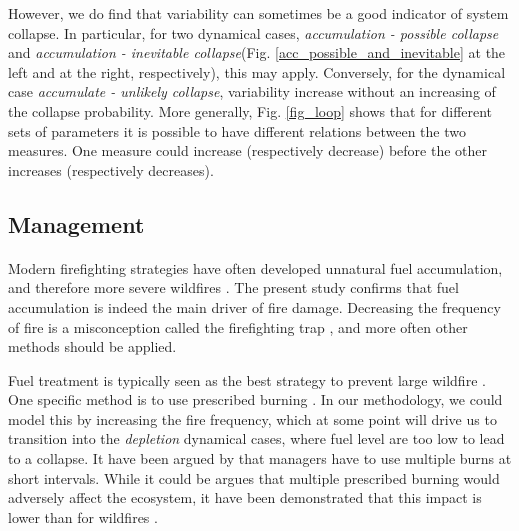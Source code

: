 \documentclass{article}
\begin{document}
However, we do find that variability can sometimes be a good indicator of system collapse. In particular, for two dynamical cases, \textit{accumulation - possible collapse} and \textit{accumulation - inevitable collapse}(Fig. \ref{acc_possible_and_inevitable} at the left and at the right, respectively), this may apply. Conversely, for the dynamical case \textit{accumulate - unlikely collapse}, variability increase without an increasing of the collapse probability. More generally, Fig. \ref{fig_loop} shows that for different sets of parameters it is possible to have different relations between the two measures. One measure could increase (respectively decrease) before the other increases (respectively decreases). %


\subsection{Management}

\paragraph{}
Modern firefighting strategies have often developed unnatural fuel accumulation, and therefore more severe wildfires \citep{schoennagel_interaction_2004}. The present study confirms that fuel accumulation is indeed the main driver of fire damage. Decreasing the frequency of fire is a misconception called the firefighting trap \citep{collins_forest_2013}, and more often other methods should be applied.

Fuel treatment is typically seen as the best strategy to prevent large wildfire \citep{liu_studying_2013, martinson_performance_nodate}. One specific method is to use prescribed burning \cite{liu_analyzing_2010}. In our methodology, we could model this by increasing the fire frequency, which at some point will drive us to transition into the \textit{depletion} dynamical cases, where fuel level are too low to lead to a collapse. It have been argued by \cite{scholl_fire_2010} that managers have to use multiple burns at short intervals. While it could be argues that multiple prescribed burning would adversely affect the ecosystem, it have been demonstrated that this impact is lower than for wildfires \citep{alcaniz2018effects, fultz2016forest, wiedinmyer2010prescribed}. 
\end{document}
